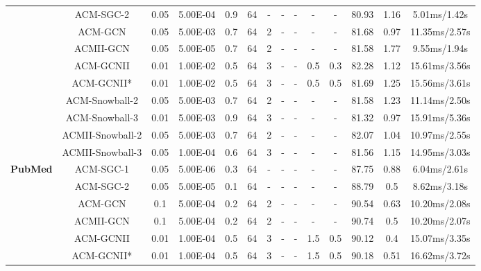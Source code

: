 \documentclass{article}
\newcommand{\0}{{\boldsymbol{0}}}
\newcommand{\6}{{\partial}}
\newcommand{\8}{{\infty}}
\newcommand{\4}{{\nabla}}
\begin{document}
\begin{table}[htbp]
{\begin{tabular}{c|c|cccccccccccc}
          & ACM-SGC-2 & 0.05  & 5.00E-04 & 0.9   & 64    & -     & -     & -     & -     & -     & 80.93 & 1.16  & 5.01ms/1.42s \\
          & ACM-GCN & 0.05  & 5.00E-03 & 0.7   & 64    & 2     & -     & -     & -     & -     & 81.68 & 0.97  & 11.35ms/2.57s \\
          & ACMII-GCN & 0.05  & 5.00E-05 & 0.7   & 64    & 2     & -     & -     & -     & -     & 81.58 & 1.77  & 9.55ms/1.94s \\
          & ACM-GCNII & 0.01  & 1.00E-02 & 0.5   & 64    & 3     & -     & -     & 0.5   & 0.3   & 82.28 & 1.12  & 15.61ms/3.56s \\
          & ACM-GCNII* & 0.01  & 1.00E-02 & 0.5   & 64    & 3     & -     & -     & 0.5   & 0.5   & 81.69 & 1.25  & 15.56ms/3.61s \\
          & ACM-Snowball-2 & 0.05  & 5.00E-03 & 0.7   & 64    & 2     & -     & -     & -     & -     & 81.58 & 1.23  & 11.14ms/2.50s \\
          & ACM-Snowball-3 & 0.01  & 5.00E-03 & 0.9   & 64    & 3     & -     & -     & -     & -     & 81.32 & 0.97  & 15.91ms/5.36s \\
          & ACMII-Snowball-2 & 0.05  & 5.00E-03 & 0.7   & 64    & 2     & -     & -     & -     & -     & 82.07 & 1.04  & 10.97ms/2.55s \\
          & ACMII-Snowball-3 & 0.05  & 1.00E-04 & 0.6   & 64    & 3     & -     & -     & -     & -     & 81.56 & 1.15  & 14.95ms/3.03s \\
          \midrule
    \multirow{10}[0]{*}{\textbf{PubMed}} & ACM-SGC-1 & 0.05  & 5.00E-06 & 0.3   & 64    & -     & -     & -     & -     & -     & 87.75 & 0.88  & 6.04ms/2.61s \\
          & ACM-SGC-2 & 0.05  & 5.00E-05 & 0.1   & 64    & -     & -     & -     & -     & -     & 88.79 & 0.5   & 8.62ms/3.18s \\
          & ACM-GCN & 0.1   & 5.00E-04 & 0.2   & 64    & 2     & -     & -     & -     & -     & 90.54 & 0.63  & 10.20ms/2.08s \\
          & ACMII-GCN & 0.1   & 5.00E-04 & 0.2   & 64    & 2     & -     & -     & -     & -     & 90.74 & 0.5   & 10.20ms/2.07s \\
          & ACM-GCNII & 0.01  & 1.00E-04 & 0.5   & 64    & 3     & -     & -     & 1.5   & 0.5   & 90.12 & 0.4   & 15.07ms/3.35s \\
          & ACM-GCNII* & 0.01  & 1.00E-04 & 0.5   & 64    & 3     & -     & -     & 1.5   & 0.5   & 90.18 & 0.51  & 16.62ms/3.72s \\

\end{tabular}}
\end{table}
\end{document}
